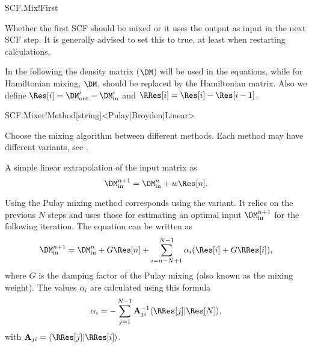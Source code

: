 \begin{fdflogicalT}{SCF.Mix!First}

  Whether the first SCF should be mixed or it uses the output as input
  in the next SCF step. It is generally advised to set this to true,
  at least when restarting calculations.
  
\end{fdflogicalT}


In the following the density matrix ($\DM$) will be used in the
equations, while for Hamiltonian mixing, $\DM$, should be replaced by
the Hamiltonian matrix.
%
Also we define $\Res[i] = \DM^i_{\mathrm{out}} - \DM^i_{\mathrm{in}}$ and 
$\RRes[i] = \Res[i] - \Res[i-1]$.

\begin{fdfentry}{SCF.Mixer!Method}[string]<Pulay|Broyden|Linear>

  Choose the mixing algorithm between different methods. Each method
  may have different variants, see .
  
  \begin{fdfoptions}

    \option[Linear] %
    A simple linear extrapolation of the input matrix as
    \begin{equation}
      \DM^{n+1}_{\mathrm{in}} = \DM^n_{\mathrm{in}} + w \Res[n].
    \end{equation}

    \option[Pulay] %
    Using the Pulay mixing method corresponds using the
    \cite{Kresse1996} variant. It relies on the previous $N$ steps and
    uses those for estimating an optimal input
    $\DM^{n+1}_{\mathrm{in}}$ for the following iteration. The
    equation can be written as
    \begin{equation}
      \DM^{n+1}_{\mathrm{in}} = \DM^n_{\mathrm{in}} + G \Res[n]
      + \sum_{i=n-N+1}^{N-1} \alpha_i (\Res[i] + G \RRes[i]),
    \end{equation}
    where $G$ is the damping factor of the Pulay mixing (also known as
    the mixing weight).
    The values $\alpha_i$ are calculated using this formula
    \begin{equation}
      \alpha_i = - \sum_{j=1}^{N-1}\mathbf A_{ji}^{-1} 
         \langle \RRes[j] | \Res[N] \rangle,
    \end{equation}    
    with $\mathbf A_{ji} = \langle \RRes[j] | \RRes[i] \rangle$.


\end{fdfoptions}
\end{fdfentry}
